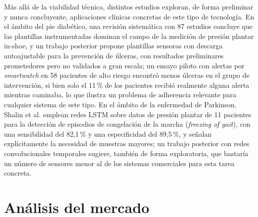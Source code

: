 \begin{IAtext}
Más allá de la viabilidad técnica, distintos estudios exploran, de forma preliminar y nunca concluyente, aplicaciones clínicas concretas de este tipo de tecnología. En el ámbito del pie diabético, una revisión sistemática con 87 estudios \cite{castro_martins_diabetic_insole_review_2024} concluye que las plantillas instrumentadas dominan el campo de la medición de presión plantar in-shoe, y un trabajo posterior \cite{hemler_intelligent_offloading_review_2023} propone plantillas sensoras con descarga autoajustable para la prevención de úlceras, con resultados preliminares prometedores pero no validados a gran escala; un ensayo piloto con alertas por \textit{smartwatch} en 58 pacientes de alto riesgo encontró menos úlceras en el grupo de intervención, si bien solo el 11\,\% de los pacientes recibió realmente alguna alerta mientras caminaba, lo que ilustra un problema de adherencia relevante para cualquier sistema de este tipo. En el ámbito de la enfermedad de Parkinson, Shalin et al. \cite{shalin_fog_lstm_plantar_pressure_2021} emplean redes LSTM sobre datos de presión plantar de 11 pacientes para la detección de episodios de congelación de la marcha (\textit{freezing of gait}), con una sensibilidad del 82{,}1\,\% y una especificidad del 89{,}5\,\%, y señalan explícitamente la necesidad de muestras mayores; un trabajo posterior con redes convolucionales temporales \cite{park_fog_tcn_pedar_2024} sugiere, también de forma exploratoria, que bastaría un número de sensores menor al de los sistemas comerciales para esta tarea concreta.

\section{Análisis del mercado}


\end{IAtext}
